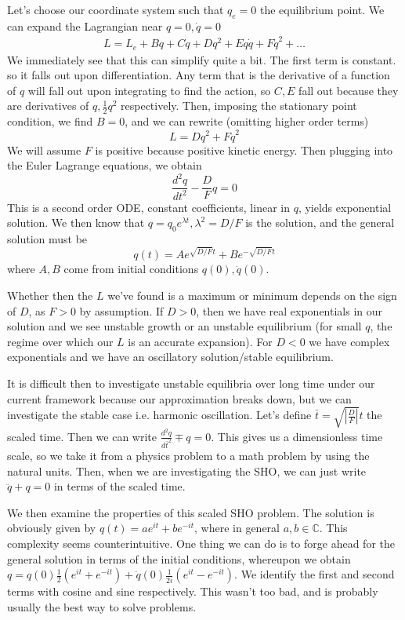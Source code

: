 \documentclass[10pt]{report}
\newcommand{\abs}[1]{\left|#1\right|}
\begin{document}
Let's choose our coordinate system such that $q_e=0$ the equilibrium point. We can expand the Lagrangian near $q=0, \dot{q}=0$
\begin{align*}
    L = L_e + Bq + C\dot{q} + Dq^2 + Eq\dot{q} + F\dot{q}^2 + \dots
\end{align*}
We immediately see that this can simplify quite a bit. The first term is constant. so it falls out upon differentiation. Any term that is the derivative of a function of $q$ will fall out upon integrating to find the action, so $C,E$ fall out because they are derivatives of $q,\frac{1}{2}q^2$ respectively. Then, imposing the stationary point condition, we find $B = 0$, and we can rewrite (omitting higher order terms)
$$L = Dq^2 + F\dot{q}^2$$
We will assume $F$ is positive because positive kinetic energy. Then plugging into the Euler Lagrange equations, we obtain
$$\frac{d^2q}{dt^2} - \frac{D}{F}q = 0$$
This is a second order ODE, constant coefficients, linear in $q$, yields exponential solution. We then know that $q = q_0e^{\lambda t}, \lambda^2 = D/F$ is the solution, and the general solution must be
$$q(t) = Ae^{\sqrt{D/F}t} + Be^{-\sqrt{D/F}t}$$
where $A,B$ come from initial conditions $q(0),\dot{q}(0)$. 

Whether then the $L$ we've found is a maximum or minimum depends on the sign of $D$, as $F > 0$ by assumption. If $D > 0$, then we have real exponentials in our solution and we see unstable growth or an unstable equilibrium (for small $q$, the regime over which our $L$ is an accurate expansion). For $D < 0$ we have complex exponentials and we have an oscillatory solution/stable equilibrium. 

It is difficult then to investigate unstable equilibria over long time under our current framework because our approximation breaks down, but we can investigate the stable case i.e. harmonic oscillation. Let's define $\bar{t} = \sqrt{\abs{\frac{D}{F}}}t$ the scaled time. Then we can write $\frac{d^2q}{d\bar{t}^2} \mp q = 0$. This gives us a dimensionless time scale, so we take it from a physics problem to a math problem by using the natural units. Then, when we are investigating the SHO, we can just write $\ddot{q} + q = 0$ in terms of the scaled time. 

We then examine the properties of this scaled SHO problem. The solution is obviously given by $q(t) = ae^{it} + be^{-it}$, where in general $a,b \in \mathbb{C}$. This complexity seems counterintuitive. One thing we can do is to forge ahead for the general solution in terms of the initial conditions, whereupon we obtain $q = q(0) \frac{1}{2}\left( e^{it} + e^{-it} \right) + \dot{q}(0) \frac{1}{2i}\left( e^{it} - e^{-it} \right)$. We identify the first and second terms with cosine and sine respectively. This wasn't too bad, and is probably usually the best way to solve problems.
\end{document}
